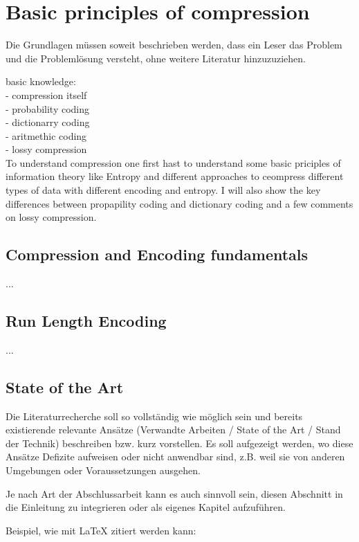 
\chapter{Basic principles of compression}
\label{ch:Basic principles of compression}
Die Grundlagen müssen soweit beschrieben
werden, dass ein Leser das Problem und
die Problemlösung versteht, ohne weitere Literatur hinzuzuziehen.

basic knowledge:\\

- compression itself \\
- probability coding\\
- dictionarry coding \\
- aritmethic coding \\
- lossy compression \\

To understand compression one first hast to understand some basic priciples of information theory like Entropy and different approaches to ceompress different types of data with different encoding and entropy. I will also show the key differences between propapility coding and dictionary coding and a few comments on lossy compression.

\section{Compression and Encoding fundamentals}
\label{ch:Basic principles of compression:sec:Compression}

...

\section{Run Length Encoding}
\label{ch:Grundlagen:sec:Run Length Encoding}

...

\section{State of the Art}
\label{ch:Grundlagen:sec:SOTA}
Die Literaturrecherche soll so vollständig wie möglich sein und bereits existierende relevante Ansätze (Verwandte Arbeiten / State of the Art / Stand der Technik) beschreiben bzw. kurz vorstellen.
Es soll aufgezeigt werden, wo diese Ansätze Defizite aufweisen oder nicht anwendbar sind, z.B. weil sie von anderen Umgebungen oder Voraussetzungen ausgehen.

Je nach Art der Abschlussarbeit kann es auch sinnvoll sein, diesen Abschnitt in die Einleitung zu integrieren oder als eigenes Kapitel aufzuführen.

Beispiel, wie mit LaTeX zitiert werden kann: \cite{TB98,JSAC96,qosr}

